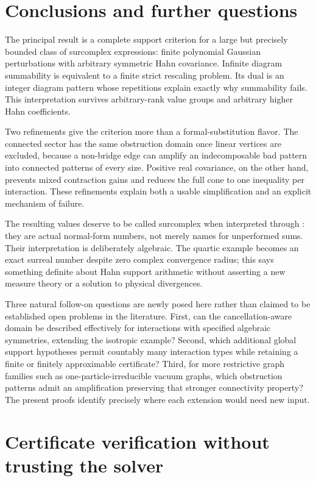 \documentclass[11pt,letterpaper]{article}
\numberwithin{equation}{section}
\theoremstyle{definition}
\theoremstyle{remark}
\begin{document}
\section{Conclusions and further questions}
\label{wick:sec:conclusion}

The principal result is a complete support criterion for a large but
precisely bounded class of surcomplex expressions: finite polynomial
Gaussian perturbations with arbitrary symmetric Hahn covariance. Infinite
diagram summability is equivalent to a finite strict rescaling problem.
Its dual is an integer diagram pattern whose repetitions explain exactly
why summability fails. This interpretation survives arbitrary-rank value
groups and arbitrary higher Hahn coefficients.

Two refinements give the criterion more than a formal-substitution flavor.
The connected sector has the same obstruction domain once linear vertices
are excluded, because a non-bridge edge can amplify an indecomposable bad
pattern into connected patterns of every size. Positive real covariance,
on the other hand, prevents mixed contraction gains and reduces the full
cone to one inequality per interaction. These refinements explain both a
usable simplification and an explicit mechanism of failure.

The resulting values deserve to be called surcomplex when interpreted
through : they are actual normal-form numbers, not
merely names for unperformed sums. Their interpretation is deliberately
algebraic. The quartic example becomes an exact surreal number despite
zero complex convergence radius; this says something definite about Hahn
support arithmetic without asserting a new measure theory or a solution to
physical divergences.

Three natural follow-on questions are newly posed here rather than claimed
to be established open problems in the literature. First, can the
cancellation-aware domain be described effectively for interactions with
specified algebraic symmetries, extending the isotropic example? Second,
which additional global support hypotheses permit countably many interaction
types while retaining a finite or finitely approximable certificate?
Third, for more restrictive graph families such as one-particle-irreducible
vacuum graphs, which obstruction patterns admit an amplification preserving
that stronger connectivity property? The present proofs identify precisely
where each extension would need new input.

\appendix
\section{Certificate verification without trusting the solver}
\label{wick:app:certificate}
\end{document}

